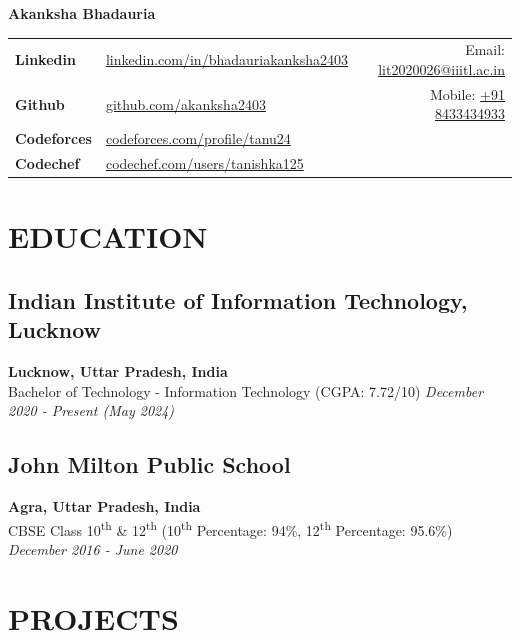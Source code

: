 \documentclass[12pt]{article}
\newcommand{\resumename}[1]{\LARGE\textbf{#1} \hfill \small}
\begin{document}
\noindent
\resumename{Akanksha Bhadauria}

\vspace*{-6pt}
\begin{table}[h]
	\hspace*{-10px}
\begin{tabular}{llr}
	\textbf{Linkedin} & \href{https://linkedin.com/in/bhadauriakanksha2403}{linkedin.com/in/bhadauriakanksha2403} \hspace*{4cm}&  Email: \href{mailto:lit2020026@iiitl.ac.in}{lit2020026@iiitl.ac.in} \\
	\textbf{Github} & \href{https://github.com/akanksha2403}{github.com/akanksha2403} & Mobile: \href{tel:+918433434933}{+91 8433434933}\\
	\textbf{Codeforces} & \href{https://codeforces.com/profile/tanu24}{codeforces.com/profile/tanu24} & \\
	\textbf{Codechef} & \href{https://codechef.com/users/tanishka125}{codechef.com/users/tanishka125} & \\
\end{tabular}
\end{table}

\vspace{-\topsep}
\section*{EDUCATION}
\subsection*{Indian Institute of Information Technology, Lucknow} \hfill \textbf{Lucknow, Uttar Pradesh, India} \\
Bachelor of Technology - Information Technology (CGPA: 7.72/10) \hfill \textit{December 2020 - Present (May 2024)} \\
\subsection*{John Milton Public School} \hfill \textbf{Agra, Uttar Pradesh, India} \\
CBSE Class 10\textsuperscript{th} \& 12\textsuperscript{th} (10\textsuperscript{th} Percentage: 94\%, 12\textsuperscript{th} Percentage: 95.6\%) \hfill \textit{December 2016 - June 2020}

\section*{PROJECTS}
\end{document}
